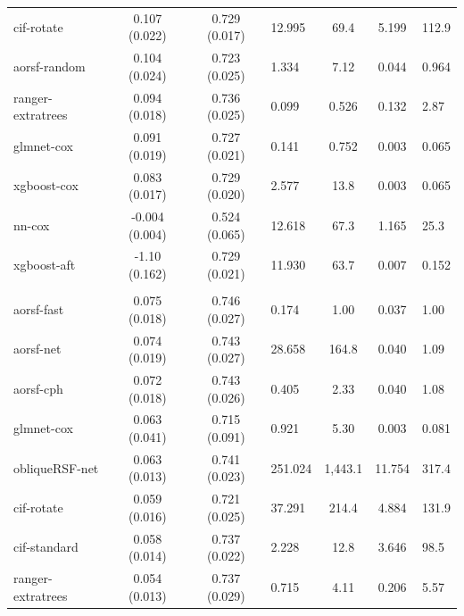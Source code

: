 \documentclass[twoside,11pt]{article}\usepackage[]{graphicx}\usepackage[]{xcolor}
\newenvironment{knitrout}{}{} %
\begin{document}
\begin{knitrout}
\begin{longtable}{lcclccl}
\hspace{1em}cif-rotate & 0.107 (0.022) & 0.729 (0.017) & 12.995 & 69.4 & 5.199 & 112.9\\
\hspace{1em}aorsf-random & 0.104 (0.024) & 0.723 (0.025) & 1.334 & 7.12 & 0.044 & 0.964\\
\hspace{1em}ranger-extratrees & 0.094 (0.018) & 0.736 (0.025) & 0.099 & 0.526 & 0.132 & 2.87\\
\hspace{1em}glmnet-cox & 0.091 (0.019) & 0.727 (0.021) & 0.141 & 0.752 & 0.003 & 0.065\\
\hspace{1em}xgboost-cox & 0.083 (0.017) & 0.729 (0.020) & 2.577 & 13.8 & 0.003 & 0.065\\
\hspace{1em}nn-cox & -0.004 (0.004) & 0.524 (0.065) & 12.618 & 67.3 & 1.165 & 25.3\\
\hspace{1em}xgboost-aft & -1.10 (0.162) & 0.729 (0.021) & 11.930 & 63.7 & 0.007 & 0.152\\
\addlinespace[0.3em]
\hline
\multicolumn{7}{l}{\textit{\textbf{GUIDE-IT; CVD death, n = 894, p = 59}}}\\
\hline
\hspace{1em}aorsf-fast & 0.075 (0.018) & 0.746 (0.027) & 0.174 & 1.00 & 0.037 & 1.00\\
\hspace{1em}aorsf-net & 0.074 (0.019) & 0.743 (0.027) & 28.658 & 164.8 & 0.040 & 1.09\\
\hspace{1em}aorsf-cph & 0.072 (0.018) & 0.743 (0.026) & 0.405 & 2.33 & 0.040 & 1.08\\
\hspace{1em}glmnet-cox & 0.063 (0.041) & 0.715 (0.091) & 0.921 & 5.30 & 0.003 & 0.081\\
\hspace{1em}obliqueRSF-net & 0.063 (0.013) & 0.741 (0.023) & 251.024 & 1,443.1 & 11.754 & 317.4\\
\hspace{1em}cif-rotate & 0.059 (0.016) & 0.721 (0.025) & 37.291 & 214.4 & 4.884 & 131.9\\
\hspace{1em}cif-standard & 0.058 (0.014) & 0.737 (0.022) & 2.228 & 12.8 & 3.646 & 98.5\\
\hspace{1em}ranger-extratrees & 0.054 (0.013) & 0.737 (0.029) & 0.715 & 4.11 & 0.206 & 5.57\\

\end{longtable}
\end{knitrout}
\end{document}
